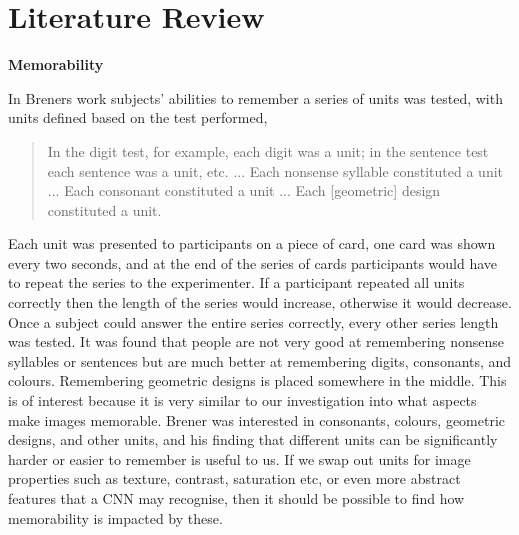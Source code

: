 \documentclass{UoYCSproject}
\begin{document}
\chapter{Literature Review}


\textbf{Memorability}


In Breners work \cite{BrenerMemorySpan} subjects' abilities to remember a series of units was tested, with units defined based on the test performed, 
\begin{quote}
    In the digit test, for example, each digit was a unit; in the sentence test each sentence was a unit, etc. ... Each nonsense syllable constituted a unit ... Each consonant constituted a unit ... Each [geometric] design constituted a unit. \cite[p.468]{BrenerMemorySpan}
\end{quote}

Each unit was presented to participants on a piece of card, one card was shown every two seconds, and at the end of the series of cards participants would have to repeat the series to the experimenter. If a participant repeated all units correctly then the length of the series would increase, otherwise it would decrease. Once a subject could answer the entire series correctly, every other series length was tested. It was found that people are not very good at remembering nonsense syllables or sentences but are much better at remembering digits, consonants, and colours. Remembering geometric designs is placed somewhere in the middle. This is of interest because it is very similar to our investigation into what aspects make images memorable. Brener was interested in consonants, colours, geometric designs, and other units, and his finding that different units can be significantly harder or easier to remember is useful to us. If we swap out units for image properties such as texture, contrast, saturation etc, or even more abstract features that a CNN may recognise, then it should be possible to find how memorability is impacted by these. 
 
\end{document}
